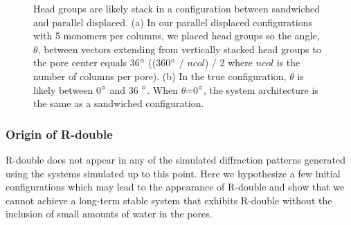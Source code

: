 \documentclass[journal=jpcbfk,manuscript=article]{achemso}
\begin{document}
\begin{figure}[!htb]
\begin{subfigure}{0.45\textwidth}
  \caption{}\label{fig:pd_lt36}
  \end{subfigure}
  \caption{Head groups are likely stack in a configuration between sandwiched and
  parallel displaced. (a) In our parallel displaced configurations with 5 monomers 
  per columns, we placed head groups so the angle, $\theta$, between vectors extending
  from vertically stacked head groups to the pore center equals 36$\degree$ 
  ((360$\degree$ / $ncol$) / 2 where $ncol$ is the number of columns per pore). 
  (b) In the true configuration, $\theta$ is likely between 0$\degree$ and 36 $\degree$.
  When $\theta$=0$\degree$, the system architecture is the same as a sandwiched 
  configuration.}\label{fig:between_pd}
  \end{figure}


  \subsubsection{Origin of R-double}\label{section:rdouble}
  
  R-double does not appear in any of the simulated diffraction patterns
  generated using the systems simulated up to this point. Here we hypothesize a
  few initial configurations which may lead to the appearance of R-double and
  show that we cannot achieve a long-term stable system that exhibits R-double
  without the inclusion of small amounts of water in the pores.
  
\end{document}
